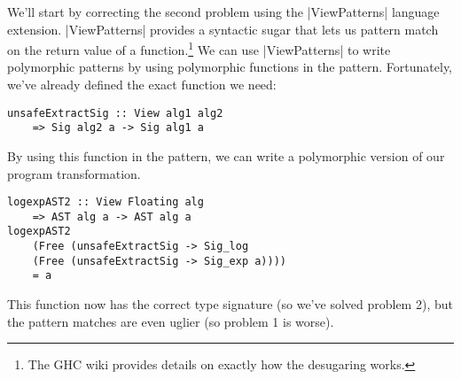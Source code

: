 \documentclass[preprint]{sigplanconf}
\theoremstyle{definition}
\begin{document}
We'll start by correcting the second problem using the |ViewPatterns| language extension.
|ViewPatterns| provides a syntactic sugar that lets us pattern match on the return value of a function.\footnote{
    The GHC wiki \cite{viewpatterns} provides details on exactly how the desugaring works.
}
We can use |ViewPatterns| to write polymorphic patterns by using polymorphic functions in the pattern.
Fortunately, we've already defined the exact function we need:
\begin{lstlisting}
unsafeExtractSig :: View alg1 alg2
    => Sig alg2 a -> Sig alg1 a
\end{lstlisting}
By using this function in the pattern,
we can write a polymorphic version of our program transformation.
\begin{lstlisting}
logexpAST2 :: View Floating alg
    => AST alg a -> AST alg a
logexpAST2
    (Free (unsafeExtractSig -> Sig_log
    (Free (unsafeExtractSig -> Sig_exp a))))
    = a
\end{lstlisting}
This function now has the correct type signature (so we've solved problem 2),
but the pattern matches are even uglier (so problem 1 is worse).
\end{document}
